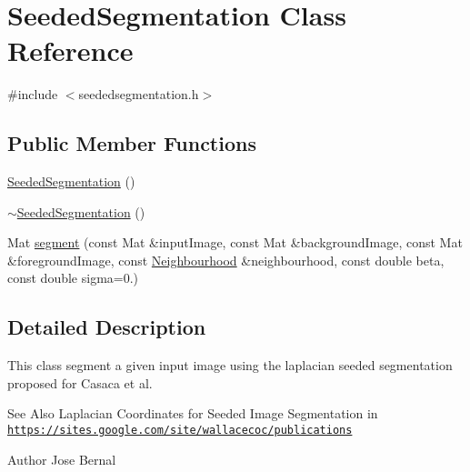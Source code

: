 \hypertarget{classSeededSegmentation}{\section{Seeded\-Segmentation Class Reference}
\label{classSeededSegmentation}
}


{\ttfamily \#include $<$seededsegmentation.\-h$>$}

\subsection*{Public Member Functions}
\begin{DoxyCompactItemize}
\item 
\hyperlink{classSeededSegmentation_ae9b10d44de68a3975d392b7fb23ff741}{Seeded\-Segmentation} ()
\item 
\hyperlink{classSeededSegmentation_ad68f11e2aa003293fd279b5f75d57c08}{$\sim$\-Seeded\-Segmentation} ()
\item 
Mat \hyperlink{classSeededSegmentation_af089f8aa4f5d28a4c2c1085486502b94}{segment} (const Mat \&input\-Image, const Mat \&background\-Image, const Mat \&foreground\-Image, const \hyperlink{classNeighbourhood}{Neighbourhood} \&neighbourhood, const double beta, const double sigma=0.)
\end{DoxyCompactItemize}


\subsection{Detailed Description}
This class segment a given input image using the laplacian seeded segmentation proposed for Casaca et al.

\begin{DoxySeeAlso}{See Also}
Laplacian Coordinates for Seeded Image Segmentation in \href{https://sites.google.com/site/wallacecoc/publications}{\tt https\-://sites.\-google.\-com/site/wallacecoc/publications}
\end{DoxySeeAlso}
\begin{DoxyAuthor}{Author}
Jose Bernal 
\end{DoxyAuthor}


